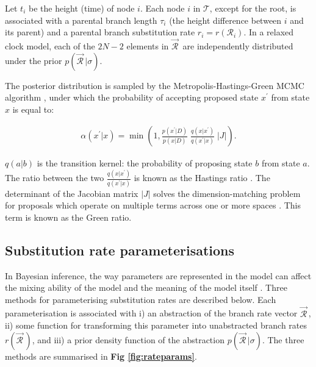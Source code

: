 \documentclass[10pt,letterpaper]{article}
\begin{document}
Let $t_i$ be the height (time) of node $i$.
Each node $i$ in $\mathcal{T}$, except for the root, is associated with a parental branch length $\tau_i$ (the height difference between $i$ and its parent)  and a parental branch substitution rate $r_i = r(\mathcal{R}_i)$. 
In a relaxed clock model, each of the $2N-2$ elements in $\vec{\mathcal{R}}^{\,}$ are independently distributed under the prior $p(\vec{\mathcal{R}}^{\,} | \sigma)$.



The posterior distribution is sampled by the Metropolis-Hastings-Green MCMC algorithm \cite{metropolis53, hastings70, green1995reversible},
under which the probability of accepting proposed state $x^\prime$ from state $x$ is equal to:

\begin{eqnarray}
\label{eq:MCMC}
\alpha(x^\prime|x) =  \min\left( 1, \frac{p(x^\prime|D)}{p(x|D)} \; \frac{q(x|x^\prime)}{q(x^\prime|x)} \; |J| \right).
\end{eqnarray}

$q(a|b)$ is the transition kernel: the probability of proposing state $b$ from state $a$.
The ratio between the two $\frac{q(x|x^\prime)}{q(x^\prime|x)}$ is known as the Hastings ratio \cite{hastings70}.
The determinant of the Jacobian matrix $|J|$ solves the dimension-matching problem for proposals which operate on multiple terms across one or more spaces \cite{green1995reversible, geyer2003metropolis}. 
This term is known as the Green ratio. 




\clearpage
\subsection*{Substitution rate parameterisations}
\label{sect:rateparams}

In Bayesian inference, the way parameters are represented in the model can affect the mixing ability of the model and the meaning of the model itself \cite{gelman2004parameterization}. Three methods for parameterising substitution rates are described below.
 Each parameterisation is associated with i) an abstraction of the branch rate vector $\vec{\mathcal{R}}^{\,}$, ii) some function for transforming this parameter into unabstracted branch rates $r(\vec{\mathcal{R}}^{\,})$, and iii) a prior density function of the abstraction $p(\vec{\mathcal{R}}^{\,} | \sigma) $. 
 The three methods are summarised in \textbf{Fig \ref{fig:rateparams}}.
\end{document}
